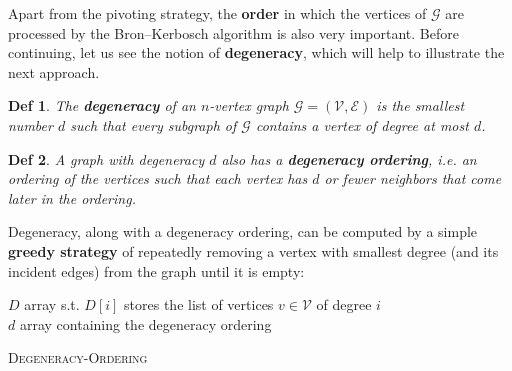 \documentclass[11pt]{article}
\newtheorem*{definition}{Def}
\begin{document}
Apart from the pivoting strategy, the \textbf{order} in which the
vertices of \(\mathcal{G}\) are processed by the Bron--Kerbosch
algorithm is also very important. Before continuing, let us see the
notion of \textbf{degeneracy}, which will help to illustrate the next
approach.

\begin{definition}
The \textbf{degeneracy} of an \(n\)-vertex graph
\(\mathcal{G} = (\mathcal{V}, \mathcal{E})\) is the smallest number
\(d\) such that every subgraph of \(\mathcal{G}\) contains a vertex of
degree at most \(d\).
\end{definition}

\begin{definition}
A graph with degeneracy \(d\) also has a \textbf{degeneracy ordering},
i.e. an ordering of the vertices such that each vertex has \(d\) or
fewer neighbors that come later in the ordering.
\end{definition}

Degeneracy, along with a degeneracy ordering, can be computed by a
simple \textbf{greedy strategy} of repeatedly removing a vertex with
smallest degree (and its incident edges) from the graph until it is
empty:

\begin{algorithm}[H]
\DontPrintSemicolon
\SetAlgoLined

  
  \BlankLine
  \BlankLine
  
  $D$ array s.t. $D[i]$ stores the list of vertices $v \in \mathcal{V}$ of degree $i$\\
  $d$ array containing the degeneracy ordering\\
  
  \BlankLine
  
  
\caption{\textsc{Degeneracy-Ordering}}
\end{algorithm}
\end{document}
